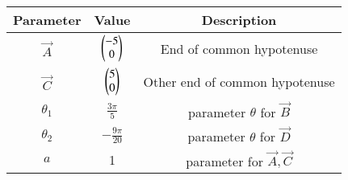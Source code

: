 
\begin{tabular}[]{|c|c|c|}
\hline
Parameter	& Value	& Description \\ \hline
$\vec{A}$	& $\begin{pmatrix}-5\\0\end{pmatrix}$ & End of common hypotenuse \\ \hline
$\vec{C}$	& $\begin{pmatrix}5\\0\end{pmatrix}$ & Other end of common hypotenuse\\[1pt] \hline
$\theta_1$		& $ \frac{3\pi}{5} $ & parameter $\theta$ for $\vec{B}$ \\[1pt] \hline
$\theta_2$ 		& $ -\frac{9 \pi}{20}$ & parameter $\theta$ for $\vec{D}$\\ \hline
$a$	& 1 	& parameter for $\vec{A},\vec{C}$ \\ \hline
\end{tabular}